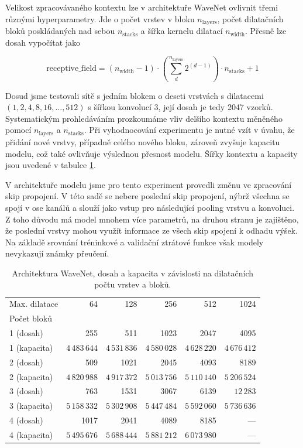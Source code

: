 Velikost zpracovávaného kontextu lze v architektuře WaveNet ovlivnit třemi různými hyperparametry. Jde o počet vrstev v bloku $n_{\mathrm{layers}}$, počet dilatačních bloků poskládaných nad sebou $n_{\mathrm{stacks}}$ a šířka kernelu dilatací $n_{\mathrm{width}}$. Přesně lze dosah vypočítat jako 

    $$\mathrm{receptive\_field} = (n_{\mathrm{width}}-1)\cdot(\sum_d^{n_{\mathrm{layers}}}{2^{(d-1)}})\cdot n_{\mathrm{stacks}}+1$$

Dosud jsme testovali sítě s jedním blokem o deseti vrstvách s dilatacemi $(1,2,4,8,16,\dots,512)$ s šířkou konvolucí 3, její dosah je tedy 2047 vzorků. Systematickým prohledáváním prozkoumáme vliv delšího kontextu měněného pomocí $n_{\mathrm{layers}}$ a $n_{\mathrm{stacks}}$. Při vyhodnocování experimentu je nutné vzít v úvahu, že přidání nové vrstvy, případně celého nového bloku, zároveň zvyšuje kapacitu modelu, což také ovlivňuje výslednou přesnost modelu. Šířky kontextu a kapacity jsou uvedené v tabulce \ref{tab:wavenet_dilation_width_numbers}.

V architektuře modelu jsme pro tento experiment provedli změnu ve zpracování skip propojení. V této sadě se nebere poslední skip propojení, nýbrž všechna se spojí v ose kanálů a slouží jako vstup pro následující pooling vrstvu a konvoluci. Z toho důvodu má model mnohem více parametrů, na druhou stranu je zajištěno, že poslední vrstvy mohou využít informace ze všech skip spojení k odhadu výšek. Na základě srovnání tréninkové a validační ztrátové funkce však modely nevykazují známky přeučení.

\begin{table}[h!]
\centering
    \begin{tabular}{lrrrrr}
    \toprule
    Max. dilatace & 64 & 128 & 256 & 512 & 1024 \\
    Počet bloků   & {} & {}  & {}  & {}  & {}  \\
    \midrule
    1 (dosah) & 255  & 511  & 1023 & 2047 & 4095 \\
    1 (kapacita) & $4\,483\,644$  & $4\,531\,836$ & $4\,580\,028$ & $4\,628\,220$ & $4\,676\,412$ \\
    2 (dosah) & 509  & 1021 & 2045 & 4093 & 8189 \\
    2 (kapacita) & $4\,820\,988$  & $4\,917\,372$ & $5\,013\,756$ & $5\,110\,140$ & $5\,206\,524$ \\
    3 (dosah) & 763  & 1531 & 3067 & 6139 & $12\,283$ \\
    3 (kapacita) & $5\,158\,332$  & $5\,302\,908$ & $5\,447\,484$ & $5\,592\,060$ & $5\,736\,636$ \\
    4 (dosah) & 1017 & 2041 & 4089 & 8185 & --- \\
    4 (kapacita) & $5\,495\,676$  & $5\,688\,444$ & $5\,881\,212$ & $6\,073\,980$ & --- \\
    \bottomrule
    \end{tabular}
\caption{Architektura WaveNet, dosah a kapacita v závislosti na dilatačních počtu vrstev a bloků.}\label{tab:wavenet_dilation_width_numbers}
\end{table}

